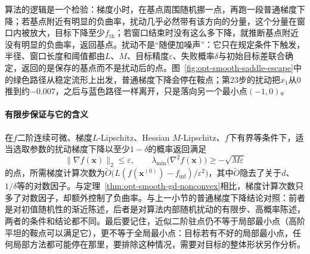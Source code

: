 算法的逻辑是一个检验：梯度小时，在基点周围随机挪一点，再跑一段普通梯度下降；若基点附近有明显的负曲率，扰动几乎必然带有该方向的分量，这个分量在窗口内被放大，目标下降至少$f_{\mathrm{th}}$；若窗口结束时没有这么多下降，就推断基点附近没有明显的负曲率，返回基点。扰动不是“随便加噪声”：它只在规定条件下触发，半径、窗口长度和阈值都由$L$、$M$、目标精度$\varepsilon$、失败概率$\delta$与初始目标差联合确定，返回的是保存的基点而不是扰动后的点。图~\ref{fig:opt-smooth-saddle-escape}中的绿色路径从稳定流形上出发，普通梯度下降会停在鞍点；第$23$步的扰动把$x_1$从$0$推到约$-0.007$，之后与蓝色路径一样离开，只是落向另一个最小点$(-1,0)$。

\paragraph{有限步保证与它的含义}
在$f$二阶连续可微、梯度$L$-Lipschitz、Hessian $M$-Lipschitz、$f$下有界等条件下，适当选取参数的扰动梯度下降以至少$1-\delta$的概率返回满足
\[
  \lVert\nabla f(\bm x)\rVert_2\leq\varepsilon,\qquad\lambda_{\min}\bigl(\nabla^2f(\bm x)\bigr)\geq-\sqrt{M\varepsilon}
\]
的点，所需梯度计算次数为$\tilde O\bigl(L(f(\bm x^{(0)})-f_{\inf})/\varepsilon^2\bigr)$，其中$\tilde O$隐去了关于$d$、$1/\delta$等的对数因子\cite{jin2017escape}。与定理~\ref{thm:opt-smooth-gd-nonconvex}相比，梯度计算次数只多了对数因子，却额外控制了负曲率。与上一小节的普通梯度下降结论对照：前者是对初值随机性的渐近陈述，后者是对算法内部随机扰动的有限步、高概率陈述，两者的条件和结论都不同。最后要记住，近似二阶驻点仍不等于局部最小点（高阶平坦的鞍点可以满足它），更不等于全局最小点：目标若有不好的局部最小点，任何局部方法都可能停在那里，要排除这种情况，需要对目标的整体形状另作分析。
